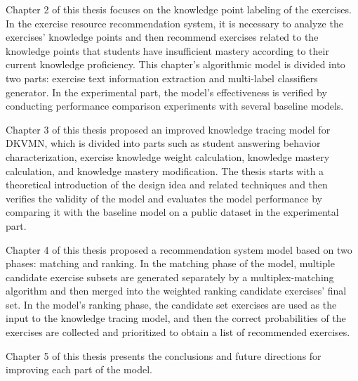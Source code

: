 Chapter 2 of this thesis focuses on the knowledge point labeling of the exercises. In the exercise resource recommendation system, it is necessary to analyze the exercises' knowledge points and then recommend exercises related to the knowledge points that students have insufficient mastery according to their current knowledge proficiency. This chapter's algorithmic model is divided into two parts: exercise text information extraction and multi-label classifiers generator. In the experimental part, the model's effectiveness is verified by conducting performance comparison experiments with several baseline models.

Chapter 3 of this thesis proposed an improved knowledge tracing model for DKVMN, which is divided into parts such as student answering behavior characterization, exercise knowledge weight calculation, knowledge mastery calculation, and knowledge mastery modification. The thesis starts with a theoretical introduction of the design idea and related techniques and then verifies the validity of the model and evaluates the model performance by comparing it with the baseline model on a public dataset in the experimental part.

Chapter 4 of this thesis proposed a recommendation system model based on two phases: matching and ranking. In the matching phase of the model, multiple candidate exercise subsets are generated separately by a multiplex-matching algorithm and then merged into the weighted ranking candidate exercises' final set. In the model's ranking phase, the candidate set exercises are used as the input to the knowledge tracing model, and then the correct probabilities of the exercises are collected and prioritized to obtain a list of recommended exercises.

Chapter 5 of this thesis presents the conclusions and future directions for improving each part of the model.

